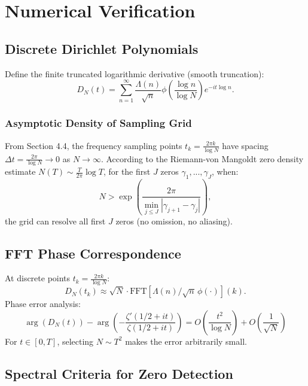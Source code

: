 \documentclass[12pt,a4paper]{amsart}
\theoremstyle{plain}
\theoremstyle{definition}
\theoremstyle{remark}
\begin{document}
\section{Numerical Verification}\label{sec:numerical}

\subsection{Discrete Dirichlet Polynomials}

Define the finite truncated logarithmic derivative (smooth truncation):
\begin{equation}
D_N(t)=\sum_{n=1}^\infty \frac{\Lambda(n)}{\sqrt{n}}\phi\left(\frac{\log n}{\log N}\right) e^{-it\log n}.
\end{equation}

\subsubsection{Asymptotic Density of Sampling Grid}\label{sec:density_sub}

From Section 4.4, the frequency sampling points $t_k = \frac{2\pi k}{\log N}$ have spacing $\Delta t = \frac{2\pi}{\log N} \to 0$ as $N\to\infty$. According to the Riemann-von Mangoldt zero density estimate $N(T) \sim \frac{T}{2\pi}\log T$, for the first $J$ zeros $\gamma_1,...,\gamma_J$, when:
\begin{equation}
N > \exp\left(\frac{2\pi}{\min_{j\leq J} |\gamma_{j+1}-\gamma_j|}\right),
\end{equation}
the grid can resolve all first $J$ zeros (no omission, no aliasing).

\subsection{FFT Phase Correspondence}

At discrete points $t_k=\frac{2\pi k}{\log N}$:
\begin{equation}
D_N(t_k) \approx \sqrt{N}\cdot \mathrm{FFT}[\Lambda(n)/\sqrt{n}\,\phi(\cdot)](k).
\end{equation}
Phase error analysis:
\begin{equation}
\arg(D_N(t)) - \arg\left(-\frac{\zeta'(1/2+it)}{\zeta(1/2+it)}\right) = O\left(\frac{t^2}{\log N}\right) + O\left(\frac{1}{\sqrt{N}}\right)
\end{equation}
For $t \in [0, T]$, selecting $N \sim T^2$ makes the error arbitrarily small.

\subsection{Spectral Criteria for Zero Detection}\label{sec:criteria}
\end{document}
